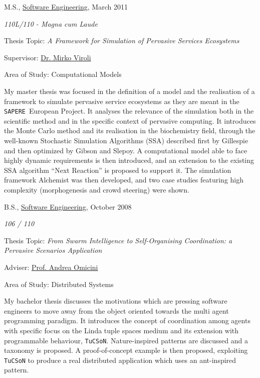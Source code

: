 \documentclass[10pt]{article}
\newcommand{\sapere}{\texttt{SAPERE}}
\newenvironment{outerlist}[1][\enskip\textbullet]%
        {\begin{itemize}[#1]}{\end{itemize}%
         \vspace{-.6\baselineskip}}
\newenvironment{innerlist}[1][\enskip\textbullet]%
        {\begin{compactitem}[#1]}{\end{compactitem}}
\newcommand{\halfblankline}{\quad\vspace{-0.5\baselineskip}\pagebreak[3]}
\begin{document}
\begin{outerlist}
\item[] M.S.,
        \href{http://www.ing2.unibo.it/Ingegneria+Cesena/default.htm}
             {Software Engineering}, March 2011
        \begin{innerlist}
        \item \emph{110L/110 - Magna cum Laude}
        \item Thesis Topic: \emph{A Framework for Simulation of Pervasive Services Ecosystems}
        \item Supervisor:
              \href{http://mirkoviroli.apice.unibo.it/}
                   {Dr. Mirko Viroli}
        \item Area of Study: Computational Models
        \end{innerlist}
 My master thesis was focused in the definition of a model and the realisation of a framework to simulate pervasive service ecosystems as they are meant in the \sapere\ European Project. It analyses the relevance of the simulation both in the scientific method and in the specific context of pervasive computing. It introduces the Monte Carlo method and its realisation in the biochemistry field, through the well-known Stochastic Simulation Algorithms (SSA) described first by Gillespie and then optimized by Gibson and Slepoy. A computational model able to face highly dynamic requirements is then introduced, and an extension to the existing SSA algorithm ``Next Reaction'' is proposed to support it. The simulation framework Alchemist was then developed, and two case studies featuring high complexity (morphogenesis and crowd steering) were shown.

\item[] B.S.,
        \href{http://www.ing2.unibo.it/Ingegneria+Cesena/default.htm}
             {Software Engineering}, October 2008
        \begin{innerlist}
        \item \emph{106 / 110}
        \item Thesis Topic: \emph{From Swarm Intelligence to Self-Organising Coordination: a Pervasive Scenarios Application}
        \item Adviser:
              \href{http://apice.unibo.it/xwiki/bin/view/AndreaOmicini/}
                   {Prof. Andrea Omicini}
        \item Area of Study: Distributed Systems
        \end{innerlist}
 My bachelor thesis discusses the motivations which are pressing software engineers to move away from the object oriented towards the multi agent programming paradigm. It introduces the concept of coordination among agents with specific focus on the Linda tuple spaces medium and its extension with programmable behaviour, \texttt{TuCSoN}. Nature-inspired patterns are discussed and a taxonomy is proposed. A proof-of-concept example is then proposed, exploiting \texttt{TuCSoN} to produce a real distributed application which uses an ant-inspired pattern.

\halfblankline
\end{outerlist}
\end{document}
